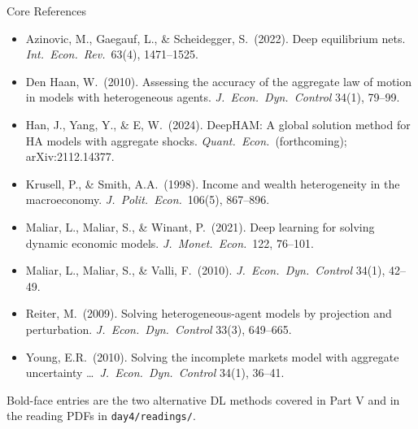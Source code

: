 \documentclass[aspectratio=169,11pt]{beamer}
\newcommand{\emphc}[1]{\textcolor{harvardcrimson}{#1}}
\begin{document}
\begin{frame}{Core References}
{\scriptsize
\begin{itemize}\itemsep0pt
    \item Azinovic, M., Gaegauf, L., \& Scheidegger, S.\ (2022). Deep equilibrium nets. \emph{Int.\ Econ.\ Rev.}\ 63(4), 1471--1525.
    \item Den Haan, W.\ (2010). Assessing the accuracy of the aggregate law of motion in models with heterogeneous agents. \emph{J.\ Econ.\ Dyn.\ Control} 34(1), 79--99.
    \item \emphc{Han, J., Yang, Y., \& E, W.\ (2024). DeepHAM: A global solution method for HA models with aggregate shocks.} \emph{Quant.\ Econ.}\ (forthcoming); arXiv:2112.14377.
    \item Krusell, P., \& Smith, A.A.\ (1998). Income and wealth heterogeneity in the macroeconomy. \emph{J.\ Polit.\ Econ.}\ 106(5), 867--896.
    \item \emphc{Maliar, L., Maliar, S., \& Winant, P.\ (2021). Deep learning for solving dynamic economic models.} \emph{J.\ Monet.\ Econ.}\ 122, 76--101.
    \item Maliar, L., Maliar, S., \& Valli, F.\ (2010). \emph{J.\ Econ.\ Dyn.\ Control} 34(1), 42--49.
    \item Reiter, M.\ (2009). Solving heterogeneous-agent models by projection and perturbation. \emph{J.\ Econ.\ Dyn.\ Control} 33(3), 649--665.
    \item Young, E.R.\ (2010). Solving the incomplete markets model with aggregate uncertainty \ldots \ \emph{J.\ Econ.\ Dyn.\ Control} 34(1), 36--41.
\end{itemize}
}

{\scriptsize Bold-face entries are the two alternative DL methods covered in Part V and in the reading PDFs in \texttt{day4/readings/}.}
\end{frame}
\end{document}
